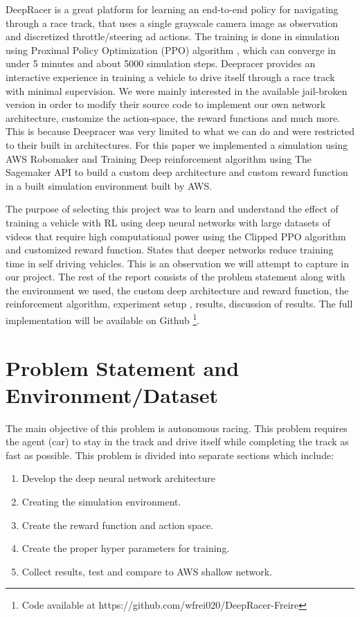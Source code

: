 \documentclass[journal]{IEEEtran}
\begin{document}
DeepRacer is a great platform for learning an end-to-end policy for navigating through a race track, that uses a single grayscale camera image as observation and discretized throttle/steering ad actions. The training is done in simulation using Proximal Policy Optimization (PPO) algorithm \cite{schulman2017proximal}, which can converge in under 5 minutes and about 5000 simulation steps. Deepracer provides an interactive experience in training a vehicle to drive itself through a race track with minimal supervision. We were mainly interested in the available jail-broken version in order to modify their source code to implement our own network architecture, customize the action-space, the reward functions and much more.  This is because Deepracer was very limited to what we can do and were restricted to their built in architectures. For this paper we implemented a simulation using AWS Robomaker and Training Deep reinforcement algorithm using The Sagemaker API to build a custom deep architecture and custom reward function in a built simulation environment built by AWS.  

The purpose of selecting this project was to learn and understand the effect of training a vehicle with RL using deep neural networks with large datasets of videos that require high computational power using the Clipped PPO algorithm and customized reward function.  \cite{7830823} States that deeper networks reduce training time in self driving vehicles.  This is an observation we will attempt to capture in our project.  The rest of the report consists of the problem statement along with the environment we used, the custom deep architecture and reward function, the reinforcement algorithm, experiment setup , results, discussion of results.  The full implementation will be available on Github \footnote{ Code available at https://github.com/wfrei020/DeepRacer-Freire}.


\section{Problem Statement and Environment/Dataset}
The main objective of this problem is autonomous racing.  This problem requires the agent (car) to stay in the track and drive itself while completing the track as fast as possible.  This problem is divided into separate sections which include:

\begin{enumerate}
  \item Develop the deep neural network architecture
  \item Creating the simulation environment.
  \item Create the reward function and action space.
  \item Create the proper hyper parameters for training.
  \item Collect results, test and compare to AWS shallow network.
\end{enumerate}
\end{document}
